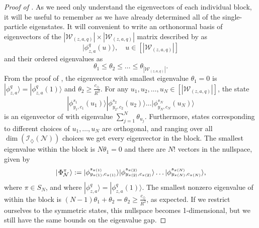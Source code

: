 \documentclass[../thesis-main/thesis-main]{subfiles}
\begin{document}
\begin{proof}[Proof of \protect{}]
As we need only understand the eigenvectors of each individual block, it will be useful to remember  as we have already determined all of the single-particle eigenstates.  It will convenient to write an orthonormal basis of eigenvectors of the $|\mathcal{W}_{(z,a,q)}|\times|\mathcal{W}_{(z,a,q)}|$ matrix described by  as 
\begin{equation}
|\phi_{z,a}^{q}(u)\rangle, \quad u\in[|\mathcal{W}_{(z,a,q)}|]\label{eq:phi_u}
\end{equation}
and their ordered eigenvalues as
\begin{equation}
\theta_{1}\leq\theta_{2}\leq\ldots\leq\theta_{|\mathcal{W}_{(z,a,q)}|}.
\end{equation}
From the proof of , the eigenvector with smallest eigenvalue $\theta_{1}=0$ is $|\phi_{z,a}^{q}\rangle=|\phi_{z,a}^{q}(1)\rangle$ and $\theta_{2}\geq\frac{c_{\diamondsuit}}{R^{2}}$. For any $u_{1},u_{2},\ldots,u_{N}\in [|\mathcal{W}_{(z,a,q)}|]$, the state 
\begin{equation}
|\phi_{y_{1},c_{1}}^{s_{1}}(u_{1})\rangle|\phi_{y_{2},c_{2}}^{s_{2}}(u_{2})\rangle\ldots|\phi_{y_{N},c_{N}}^{s_{N}}(u_{N})\rangle
\end{equation}
is an eigenvector of  with eigenvalue $\sum_{j=1}^{N}\theta_{u_j}.$ Furthermore, states corresponding to different choices of $u_{1},\ldots,u_{N}$ are orthogonal, and ranging over all $\dim(\mathcal{I}_{\diamondsuit}(\mathcal{N}))$ choices we get every eigenvector in the block. The smallest eigenvalue within the block is $N\theta_{1}=0$ and there are $N!$ vectors in the nullspace, given by
\begin{equation}
  |\mspace{2mu} \Phi_\mathcal{N}^{\pi} \mspace{2mu} \rangle := |\phi_{y_{\pi(1)},c_{\pi(1)}}^{s_{\pi(1)}}\rangle|\phi_{y_{\pi(2)},c_{\pi(2)}}^{s_{\pi(2)}}\rangle\ldots|\phi_{y_{\pi(N)},c_{\pi(N)}}^{s_{\pi(N)}}\rangle,\label{eq:vector_type1}
\end{equation}
where $\pi \in S_N$, and where $|\phi_{z,a}^{q}\rangle=|\phi_{z,a}^{q}(1)\rangle$. The smallest nonzero eigenvalue of  within the block is $(N-1)\theta_{1}+\theta_{2}=\theta_{2}\geq\frac{c_{\diamondsuit}}{R^{2}}$, as expected.  If we restrict ourselves to the symmetric states, this nullspace becomes 1-dimensional, but we still have the same bounds on the eigenvalue gap.


\end{proof}
\end{document}
